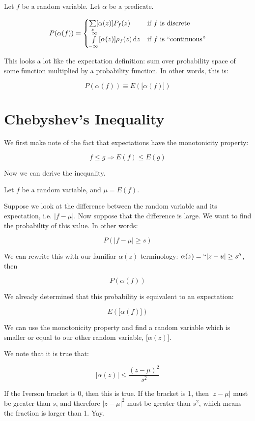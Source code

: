 \documentclass{article}
\renewcommand{\d}[1]{\,\textnormal{d}#1}
\begin{document}
Let $f$ be a random variable. Let $\alpha$ be a predicate.

\[
P(\alpha(f))=\begin{cases}
\sum\limits_z\lbrack\alpha(z)\rbrack P_f(z) & \text{if $f$ is discrete} \\
\int\limits_{-\infty}^\infty \lbrack\alpha(z)\rbrack \rho_f(z)\d{z} & \text{if $f$ is ``continuous''} \\
\end{cases}
\]

This looks a lot like the expectation definition: sum over probability
space of some function multiplied by a probability function. In other
words, this is:

\[
P(\alpha(f))\equiv E(\lbrack\alpha(f)\rbrack)
\]

\section*{Chebyshev's Inequality}

We first make note of the fact that expectations have the monotonicity
property:

\[
f\le g \Rightarrow E(f)\le E(g)
\]

Now we can derive the inequality.

Let $f$ be a random variable, and $\mu=E(f)$.

Suppose we look at the difference between the random variable and its
expectation, i.e. $|f-\mu|$. Now suppose that the difference is
large. We want to find the probability of this value. In other words:

\[
P(|f-\mu|\ge s)
\]

We can rewrite this with our familiar $\alpha(z)$ terminology:
$\alpha(z)=``|z-u|\ge{}s''$, then

\[
P(\alpha(f))
\]

We already determined that this probability is equivalent to an
expectation:

\[
E(\lbrack\alpha(f)\rbrack)
\]

We can use the monotonicity property and find a random variable which
is smaller or equal to our other random variable,
$\lbrack\alpha(z)\rbrack$.

We note that it is true that:

\[
\lbrack\alpha(z)\rbrack\le \dfrac{(z-\mu)^2}{s^2}
\]

If the Iverson bracket is 0, then this is true. If the bracket is 1,
then $|z-\mu|$ must be greater than $s$, and therefore $|z-\mu|^2$
must be greater than $s^2$, which means the fraction is larger than
1. Yay.
\end{document}
